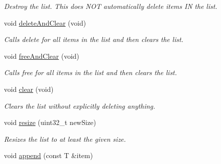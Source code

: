 \begin{DoxyCompactItemize}
\begin{DoxyCompactList}\small\item\em \-Destroy the list. \-This does \-N\-O\-T automatically delete items \-I\-N the list. \end{DoxyCompactList}\item 
\hypertarget{classxsens_1_1List_adbce5190d5109bc031d3802a4812bdf9}{void \hyperlink{classxsens_1_1List_adbce5190d5109bc031d3802a4812bdf9}{delete\-And\-Clear} (void)}\label{classxsens_1_1List_adbce5190d5109bc031d3802a4812bdf9}

\begin{DoxyCompactList}\small\item\em \-Calls delete for all items in the list and then clears the list. \end{DoxyCompactList}\item 
\hypertarget{classxsens_1_1List_ab0c369a0c23ed78a81a0f6f86aece167}{void \hyperlink{classxsens_1_1List_ab0c369a0c23ed78a81a0f6f86aece167}{free\-And\-Clear} (void)}\label{classxsens_1_1List_ab0c369a0c23ed78a81a0f6f86aece167}

\begin{DoxyCompactList}\small\item\em \-Calls free for all items in the list and then clears the list. \end{DoxyCompactList}\item 
\hypertarget{classxsens_1_1List_a9373a59d838df7cb2b490922e0575e34}{void \hyperlink{classxsens_1_1List_a9373a59d838df7cb2b490922e0575e34}{clear} (void)}\label{classxsens_1_1List_a9373a59d838df7cb2b490922e0575e34}

\begin{DoxyCompactList}\small\item\em \-Clears the list without explicitly deleting anything. \end{DoxyCompactList}\item 
\hypertarget{classxsens_1_1List_ad0d3ec4b9ea25c2efab34838c0ec9df5}{void \hyperlink{classxsens_1_1List_ad0d3ec4b9ea25c2efab34838c0ec9df5}{resize} (uint32\-\_\-t new\-Size)}\label{classxsens_1_1List_ad0d3ec4b9ea25c2efab34838c0ec9df5}

\begin{DoxyCompactList}\small\item\em \-Resizes the list to at least the given size. \end{DoxyCompactList}\item 
\hypertarget{classxsens_1_1List_a044c25a8fe1641e3fa8ec6c6fca96117}{void \hyperlink{classxsens_1_1List_a044c25a8fe1641e3fa8ec6c6fca96117}{append} (const \-T \&item)}\label{classxsens_1_1List_a044c25a8fe1641e3fa8ec6c6fca96117}


\end{DoxyCompactItemize}
